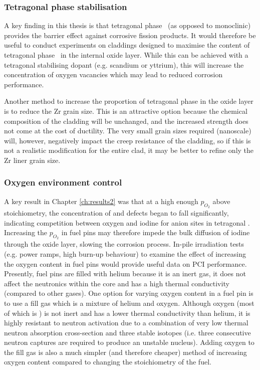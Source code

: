 \subsubsection{Tetragonal phase stabilisation}

A key finding in this thesis is that tetragonal phase \zirconia\ (as opposed to monoclinic) provides the barrier effect against corrosive fission products. It would therefore be useful to conduct experiments on claddings designed to maximise the content of tetragonal phase \zirconia\ in the internal oxide layer. While this can be achieved with a tetragonal stabilising dopant (e.g. scandium or yttrium), this will increase the concentration of oxygen vacancies which may lead to reduced corrosion performance. 

Another method to increase the proportion of tetragonal phase in the oxide layer is to reduce the Zr grain size. This is an attractive option because the chemical composition of the cladding will be unchanged, and the increased strength does not come at the cost of ductility. The very small grain sizes required (nanoscale) will, however, negatively impact the creep resistance of the cladding, so if this is not a realistic modification for the entire clad, it may be better to refine only the Zr liner grain size. 

\subsubsection{Oxygen environment control}

A key result in Chapter \ref{ch:results2} was that at a high enough $p_{O_{2}}$ above stoichiometry, the concentration of  and  defects began to fall significantly, indicating competition between oxygen and iodine for anion sites in tetragonal \zirconia . Increasing the $p_{O_{2}}$ in fuel pins may therefore impede the bulk diffusion of iodine through the oxide layer, slowing the corrosion process. In-pile irradiation tests (e.g. power ramps, high burn-up behaviour) to examine the effect of increasing the oxygen content in fuel pins would provide useful data on PCI performance. Presently, fuel pins are filled with helium because it is an inert gas, it does not affect the neutronics within the core and has a high thermal conductivity (compared to other gases). One option for varying oxygen content in a fuel pin is to use a fill gas which is a mixture of helium and oxygen. Although oxygen (most of which is ) is not inert and has a lower thermal conductivity than helium, it is highly resistant to neutron activation due to a combination of very low thermal neutron absorption cross-section and three stable isotopes (i.e. three consecutive neutron captures are required to produce an unstable  nucleus). Adding oxygen to the fill gas is also a much simpler (and therefore cheaper) method of increasing oxygen content compared to changing the stoichiometry of the fuel.

